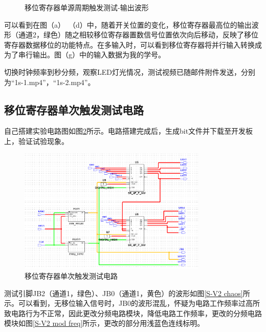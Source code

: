 \documentclass[UTF8]{ctexart}
\numberwithin{figure}{subsection}
\numberwithin{table}{subsection}
\numberwithin{equation}{subsection}
\begin{document}
\begin{figure}[H]
    \caption{移位寄存器单源周期触发测试-输出波形}
    \label{1S-V2 osci}
\end{figure}
可以看到在图（a）~（d）中，随着开关位置的变化，移位寄存器最高位的输出波形（通道2，绿色）随之相较移位寄存器置数信号位置依次向后移动，反映了移位寄存器数据移位的功能特点。在多输入时，可以看到移位寄存器将并行输入转换成为了串行输出。图（g）中的输入数据为我的学号。

\par 切换时钟频率到秒分频，观察LED灯光情况，测试视频已随邮件附件发送，分别为“1s-1.mp4”，“1s-2.mp4”。


\subsection{移位寄存器单次触发测试电路}
自己搭建实验电路图如图\ref{S-V2}所示。电路搭建完成后，生成bit文件并下载至开发板上，验证试验现象。

\begin{figure}[H]
    \begin{center}
        \includegraphics[width=0.8\textwidth]{pics/S-V2/circuit.png}
    \end{center}
    \caption{移位寄存器单次触发测试电路}
    \label{S-V2}
\end{figure}

测试引脚JB2（通道1，绿色）、JB0（通道1，黄色）的波形如图\ref{S-V2 chaos}所示。可以看到，无移位输入信号时，JB0的波形混乱，怀疑为电路工作频率过高所致电路行为不正常，因此更改分频电路模块，降低电路工作频率，更改的分频电路模块如图\ref{S-V2 mod freq}所示，更改的部分用浅蓝色连线标明。
\end{document}

